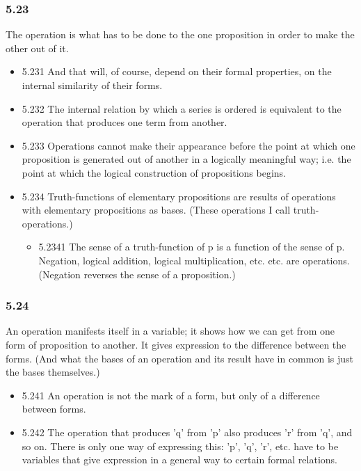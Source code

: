\documentclass[11pt]{article}
\begin{document}
\subsubsection*{5.23}
\label{sec:org08e5453}
The operation is what has to be done to the one proposition in order
to make the other out of it.
\begin{itemize}
\item 5.231
\label{sec:org251081b}
And that will, of course, depend on their formal properties, on the
internal similarity of their forms.
\item 5.232
\label{sec:org88d37ed}
The internal relation by which a series is ordered is equivalent to
the operation that produces one term from another.
\item 5.233
\label{sec:orgd171f30}
Operations cannot make their appearance before the point at which one
proposition is generated out of another in a logically meaningful way; i.e.
the point at which the logical construction of propositions begins.
\item 5.234
\label{sec:org752e578}
Truth-functions of elementary propositions are results of operations
with elementary propositions as bases. (These operations I call truth-
operations.)
\begin{itemize}
\item 5.2341
\label{sec:orgcee65ba}
The sense of a truth-function of p is a function of the sense of p.
Negation, logical addition, logical multiplication, etc. etc. are
operations. (Negation reverses the sense of a proposition.)
\end{itemize}
\end{itemize}
\subsubsection*{5.24}
\label{sec:orgad1fc76}
An operation manifests itself in a variable; it shows how we can get
from one form of proposition to another. It gives expression to the
difference between the forms. (And what the bases of an operation and its
result have in common is just the bases themselves.)
\begin{itemize}
\item 5.241
\label{sec:org8c3e816}
An operation is not the mark of a form, but only of a difference
between forms.
\item 5.242
\label{sec:orgd550519}
The operation that produces 'q' from 'p' also produces 'r' from 'q',
and so on. There is only one way of expressing this: 'p', 'q', 'r', etc.
have to be variables that give expression in a general way to certain
formal relations.
\end{itemize}
\end{document}
